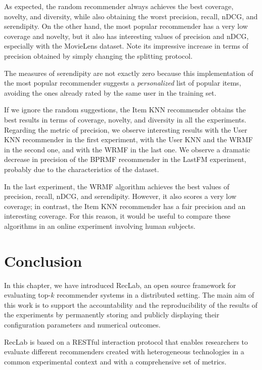 As expected, the random recommender always achieves the best coverage, novelty, and diversity, while also obtaining the worst precision, recall, nDCG, and serendipity. On the other hand, the most popular recommender has a very low coverage and novelty, but it also has interesting values of precision and nDCG, especially with the MovieLens dataset. Note its impressive increase in terms of precision obtained by simply changing the splitting protocol.

The measures of serendipity are not exactly zero because this implementation of the most popular recommender suggests a \emph{personalized} list of popular items, avoiding the ones already rated by the same user in the training set.

If we ignore the random suggestions, the Item KNN recommender obtains the best results in terms of coverage, novelty, and diversity in all the experiments. Regarding the metric of precision, we observe interesting results with the User KNN recommender in the first experiment, with the User KNN and the WRMF in the second one, and with the WRMF in the last one. We observe a dramatic decrease in precision of the BPRMF recommender in the LastFM experiment, probably due to the characteristics of the dataset.

In the last experiment, the WRMF algorithm achieves the best values of precision, recall, nDCG, and serendipity. However, it also scores a very low coverage; in contrast, the Item KNN recommender has a fair precision and an interesting coverage. For this reason, it would be useful to compare these algorithms in an online experiment involving human subjects.


\section{Conclusion}
\label{lab:sec:conclusion}

In this chapter, we have introduced RecLab, an open source framework for evaluating top-$k$ recommender systems in a distributed setting. The main aim of this work is to support the accountability and the reproducibility of the results of the experiments by permanently storing and publicly displaying their configuration parameters and numerical outcomes.

RecLab is based on a RESTful interaction protocol that enables researchers to evaluate different recommenders created with heterogeneous technologies in a common experimental context and with a comprehensive set of metrics.


